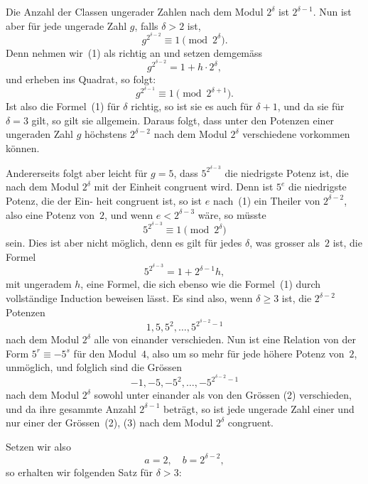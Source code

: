 \documentclass[12pt,a4paper]{article}
\theoremstyle{plain}
\theoremstyle{definition}
\theoremstyle{remark}
\begin{document}
Die Anzahl der Classen ungerader Zahlen nach dem Modul
$2^\delta$ ist $2^{\delta-1}$. Nun ist aber für jede ungerade Zahl $g$, falls $\delta > 2$ ist,
\begin{equation}\tag{1}
g^{2^{\delta-2}} \equiv 1 \pmod{2^\delta}.
\end{equation}
Denn nehmen wir~(1) als richtig an und setzen demgemäss
\[
g^{2^{\delta-2}} = 1 + h \cdot 2^\delta,
\]
und erheben ins Quadrat, so folgt:
\[
g^{2^{\delta-1}} \equiv 1 \pmod{2^{\delta+1}}.
\]
Ist also die Formel~(1) für $\delta$ richtig, so ist sie es auch für
$\delta + 1$, und da sie für $\delta = 3$ gilt, so gilt sie allgemein. Daraus
folgt, dass unter den Potenzen einer ungeraden Zahl $g$ höchstens
$2^{\delta-2}$ nach dem Modul $2^\delta$ verschiedene vorkommen können.

Andererseits folgt aber leicht für $g = 5$, dass $5^{2^{\delta-3}}$ die
niedrigste Potenz ist, die nach dem Modul $2^\delta$ mit der Einheit
congruent wird. Denn ist $5^e$ die niedrigste Potenz, die der Ein-
heit congruent ist, so ist $e$ nach~(1) ein Theiler von $2^{\delta-2}$, also
eine Potenz von~$2$, und wenn $e < 2^{\delta-3}$ wäre, so müsste
\[
5^{2^{\delta-3}} \equiv 1 \pmod{2^\delta}
\]
sein. Dies ist aber nicht möglich, denn es gilt für jedes $\delta$, was
grosser als~$2$ ist, die Formel
\[
5^{2^{\delta-3}} = 1 + 2^{\delta-1} h,
\]
mit ungeradem $h$, eine Formel, die sich ebenso wie die Formel~(1)
durch vollständige Induction beweisen lässt. Es sind also, wenn
$\delta \geq 3$ ist, die $2^{\delta-2}$ Potenzen
\begin{equation}\tag{2}
1, 5, 5^2, \ldots, 5^{2^{\delta-2}-1}
\end{equation}
nach dem Modul $2^\delta$ alle von einander verschieden. Nun ist eine
Relation von der Form $5^r \equiv -5^s$ für den Modul~$4$, also um
so mehr für jede höhere Potenz von~$2$, unmöglich, und folglich
sind die Grössen
\begin{equation}\tag{3}
-1, -5, -5^2, \ldots, -5^{2^{\delta-2}-1}
\end{equation}
nach dem Modul $2^\delta$ sowohl unter einander als von den Grössen
(2) verschieden, und da ihre gesammte Anzahl $2^{\delta-1}$ beträgt, so
ist jede ungerade Zahl einer und nur einer der Grössen~(2), (3)
nach dem Modul $2^\delta$ congruent.

Setzen wir also
\begin{equation}\tag{4}
a = 2, \quad b = 2^{\delta-2},
\end{equation}
so erhalten wir folgenden Satz für $\delta > 3$:
\end{document}
